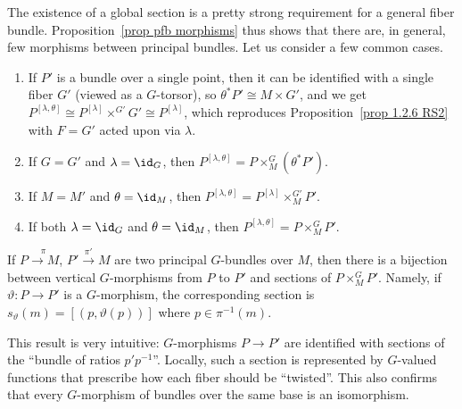 \begin{example}
    The existence of a global section is a pretty strong requirement for a general fiber bundle. Proposition~\ref{prop pfb morphisms} thus shows that there are, in general, few morphisms between principal bundles. Let us consider a few common cases.
    \begin{enumerate}
        \item If $P'$ is a bundle over a single point, then it can be identified with a single fiber $G'$ (viewed as a $G$-torsor), so $\theta^\ast P'\cong M\times G'$, and we get $P^{[\lambda,\theta]}\cong P^{[\lambda]}\times^{G'}G'\cong P^{[\lambda]}$, which reproduces Proposition~\ref{prop 1.2.6 RS2} with $F=G'$ acted upon via $\lambda$.
        \item If $G=G'$ and $\lambda=\id_G$, then $P^{[\lambda,\theta]}=P\times^G_M(\theta^\ast P')$. 
        \item If $M=M'$ and $\theta=\id_M$, then $P^{[\lambda,\theta]}=P^{[\lambda]}\times^{G'}_MP'$. 
        \item If both $\lambda=\id_G$ and $\theta=\id_M$, then $P^{[\lambda,\theta]}=P\times^G_MP'$. 
    \end{enumerate}
\end{example}

\begin{cor}[{{\cite[Cor.~1.2.7]{RS2}}}]\label{cor 1.2.7 RS2}
    If $P\overset{\pi}{\to M}$, $P'\overset{\pi'}{\to}M$ are two principal $G$-bundles over $M$, then there is a bijection between vertical $G$-morphisms from $P$ to $P'$ and sections of $P\times^G_MP'$. Namely, if $\vartheta:P\to P'$ is a $G$-morphism, the corresponding section is $s_\vartheta(m)=[(p,\vartheta(p))]$ where $p\in\pi^{-1}(m)$.
\end{cor}
This result is very intuitive: $G$-morphisms $P\to P'$ are identified with sections of the ``bundle of ratios $p'p^{-1}$''. Locally, such a section is represented by $G$-valued functions that prescribe how each fiber should be ``twisted''. This also confirms that every $G$-morphism of bundles over the same base is an isomorphism.

